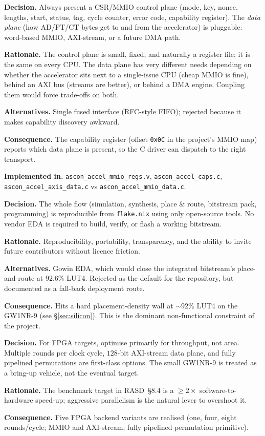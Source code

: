 \documentclass[11pt,a4paper]{article}
\newcommand{\dd}[3]{%
  \begin{tcolorbox}[
    enhanced, colback=ddbg, colframe=ddframe,
    arc=2pt, boxrule=0.5pt,
    left=6pt, right=6pt, top=3pt, bottom=3pt,
    attach boxed title to top left={yshift=-2mm, xshift=8pt},
    boxed title style={colback=ddframe, arc=2pt, boxrule=0pt,
                       left=4pt, right=4pt, top=2pt, bottom=2pt},
    title={\small\bfseries\color{white}#1\enspace\textbar\enspace\textit{#2}},
    before upper={\small}
  ]
  #3
  \end{tcolorbox}\vspace{3pt}}
\begin{document}
\dd{DD-003}{Control plane vs.\ data plane split}{
\textbf{Decision.} Always present a CSR/MMIO control plane (mode, key,
nonce, lengths, start, status, tag, cycle counter, error code, capability
register). The \emph{data plane} (how AD/PT/CT bytes get to and from the
accelerator) is pluggable: word-based MMIO, AXI-stream, or a future
DMA path.

\textbf{Rationale.} The control plane is small, fixed, and naturally a
register file; it is the same on every CPU. The data plane has very
different needs depending on whether the accelerator sits next to a
single-issue CPU (cheap MMIO is fine), behind an AXI bus (streams are
better), or behind a DMA engine. Coupling them would force trade-offs
on both.

\textbf{Alternatives.} Single fused interface (RFC-style FIFO); rejected
because it makes capability discovery awkward.

\textbf{Consequence.} The capability register (offset \texttt{0x0C} in the
project's MMIO map) reports which data plane is present, so the C driver
can dispatch to the right transport.

\textbf{Implemented in.} \texttt{ascon\_accel\_mmio\_regs.v},
\texttt{ascon\_accel\_caps.c},
\texttt{ascon\_accel\_axis\_data.c} vs \texttt{ascon\_accel\_mmio\_data.c}.
}

\dd{DD-004}{Open-source-only toolchain}{
\textbf{Decision.} The whole flow (simulation, synthesis, place \& route,
bitstream pack, programming) is reproducible from \texttt{flake.nix}
using only open-source tools. No vendor EDA is required to build,
verify, or flash a working bitstream.

\textbf{Rationale.} Reproducibility, portability, transparency, and
the ability to invite future contributors without licence friction.

\textbf{Alternatives.} Gowin EDA, which would close the integrated
bitstream's place-and-route at $92.6\%$ LUT4. Rejected as the default
for the repository, but documented as a fall-back deployment route.

\textbf{Consequence.} Hits a hard placement-density wall at $\sim 92\%$
LUT4 on the GW1NR-9 (see §\ref{sec:silicon}). This is the dominant
non-functional constraint of the project.
}

\dd{DD-005}{FPGA: maximum throughput first}{
\textbf{Decision.} For FPGA targets, optimise primarily for throughput,
not area. Multiple rounds per clock cycle, $128$-bit AXI-stream data
plane, and fully pipelined permutations are first-class options. The
small GW1NR-9 is treated as a bring-up vehicle, not the eventual target.

\textbf{Rationale.} The benchmark target in RASD~§8.4 is a $\geq 2\times$
software-to-hardware speed-up; aggressive parallelism is the natural
lever to overshoot it.

\textbf{Consequence.} Five FPGA backend variants are realised (one,
four, eight rounds/cycle; MMIO and AXI-stream; fully pipelined
permutation primitive).
}
\end{document}
